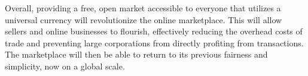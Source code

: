 \documentclass[12pt]{report}
\begin{document}
Overall, providing a free, open market accessible to everyone that utilizes a universal currency will revolutionize the online marketplace. This will allow sellers and online businesses to flourish, effectively reducing the overhead costs of trade and preventing large corporations from directly profiting from transactions. The marketplace will then be able to return to its previous fairness and simplicity, now on a global scale.
\end{document}
